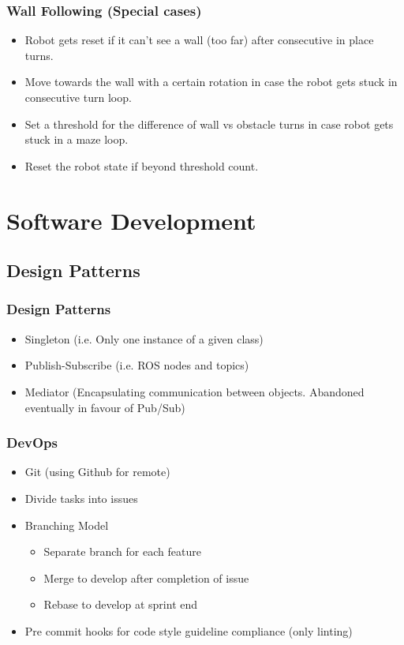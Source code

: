\documentclass{beamer}
\begin{document}
\begin{frame}
\frametitle{Wall Following (Special cases)}
\begin{itemize}
\item Robot gets reset if it can't see a wall (too far) after consecutive in place turns.
\item Move towards the wall with a certain rotation in case the robot gets stuck in consecutive turn loop.
\item Set a threshold for the difference of wall vs obstacle turns in case robot gets stuck in a maze loop. 
\item Reset the robot state if beyond threshold count.
\end{itemize}
\end{frame}


\section{Software Development}
\subsection{Design Patterns}
\begin{frame}
\frametitle{Design Patterns}
\begin{itemize}
\item Singleton (i.e. Only one instance of a given class)
\item Publish-Subscribe (i.e. ROS nodes and topics)
\item Mediator (Encapsulating communication between objects. Abandoned eventually in favour of Pub/Sub)
\end{itemize}
\end{frame}

\begin{frame}
\frametitle{DevOps}
\begin{itemize}
\item Git (using Github for remote)
\item Divide tasks into issues
\item Branching Model
\begin{itemize}
\item Separate branch for each feature
\item Merge to develop after completion of issue
\item Rebase to develop at sprint end
\end{itemize}
\item Pre commit hooks for code style guideline compliance (only linting)
\end{itemize}
\end{frame}
\end{document}
